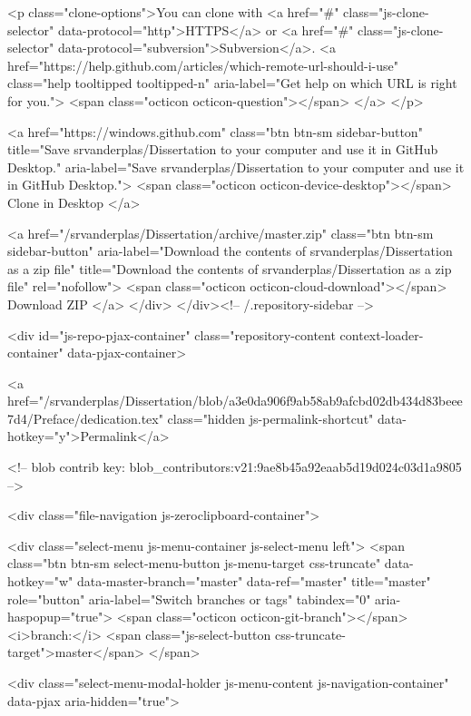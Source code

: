 <p class="clone-options">You can clone with
  <a href="#" class="js-clone-selector" data-protocol="http">HTTPS</a> or <a href="#" class="js-clone-selector" data-protocol="subversion">Subversion</a>.
  <a href="https://help.github.com/articles/which-remote-url-should-i-use" class="help tooltipped tooltipped-n" aria-label="Get help on which URL is right for you.">
    <span class="octicon octicon-question"></span>
  </a>
</p>


  <a href="https://windows.github.com" class="btn btn-sm sidebar-button" title="Save srvanderplas/Dissertation to your computer and use it in GitHub Desktop." aria-label="Save srvanderplas/Dissertation to your computer and use it in GitHub Desktop.">
    <span class="octicon octicon-device-desktop"></span>
    Clone in Desktop
  </a>


                <a href="/srvanderplas/Dissertation/archive/master.zip"
                   class="btn btn-sm sidebar-button"
                   aria-label="Download the contents of srvanderplas/Dissertation as a zip file"
                   title="Download the contents of srvanderplas/Dissertation as a zip file"
                   rel="nofollow">
                  <span class="octicon octicon-cloud-download"></span>
                  Download ZIP
                </a>
              </div>
        </div><!-- /.repository-sidebar -->

        <div id="js-repo-pjax-container" class="repository-content context-loader-container" data-pjax-container>

          

<a href="/srvanderplas/Dissertation/blob/a3e0da906f9ab58ab9afcbd02db434d83beee7d4/Preface/dedication.tex" class="hidden js-permalink-shortcut" data-hotkey="y">Permalink</a>

<!-- blob contrib key: blob_contributors:v21:9ae8b45a92eaab5d19d024c03d1a9805 -->

<div class="file-navigation js-zeroclipboard-container">
  
<div class="select-menu js-menu-container js-select-menu left">
  <span class="btn btn-sm select-menu-button js-menu-target css-truncate" data-hotkey="w"
    data-master-branch="master"
    data-ref="master"
    title="master"
    role="button" aria-label="Switch branches or tags" tabindex="0" aria-haspopup="true">
    <span class="octicon octicon-git-branch"></span>
    <i>branch:</i>
    <span class="js-select-button css-truncate-target">master</span>
  </span>

  <div class="select-menu-modal-holder js-menu-content js-navigation-container" data-pjax aria-hidden="true">


